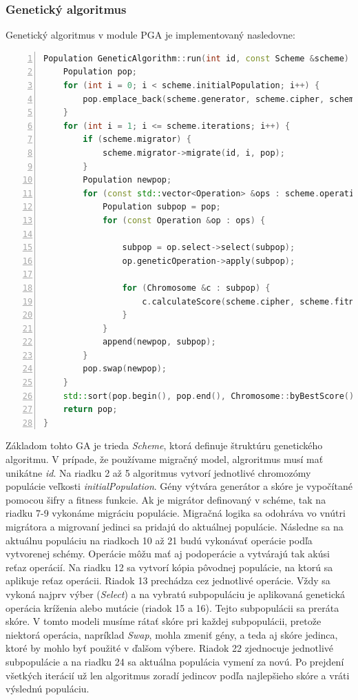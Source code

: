 \subsubsection{Genetický algoritmus}
Genetický algoritmus v module PGA je implementovaný nasledovne:
\begin{lstlisting}[language={c++}, caption={Genetický algoritmus}, numbers=left]
Population GeneticAlgorithm::run(int id, const Scheme &scheme) {
    Population pop;
    for (int i = 0; i < scheme.initialPopulation; i++) {
        pop.emplace_back(scheme.generator, scheme.cipher, scheme.fitness);
    }
    for (int i = 1; i <= scheme.iterations; i++) {
        if (scheme.migrator) {
            scheme.migrator->migrate(id, i, pop);
        }
        Population newpop;
        for (const std::vector<Operation> &ops : scheme.operations) {
            Population subpop = pop;
            for (const Operation &op : ops) {
          
                subpop = op.select->select(subpop);
                op.geneticOperation->apply(subpop);
          
                for (Chromosome &c : subpop) {
                    c.calculateScore(scheme.cipher, scheme.fitness, scheme.cache);
                }
            }
            append(newpop, subpop);
        }
        pop.swap(newpop);
    }
    std::sort(pop.begin(), pop.end(), Chromosome::byBestScore());
    return pop;
}
\end{lstlisting}
Základom tohto GA je trieda \textit{Scheme}, ktorá definuje štruktúru genetického algoritmu. V prípade, že používame migračný model, algroritmus musí mať unikátne \textit{id}.
Na riadku 2 až 5 algoritmus vytvorí jednotlivé chromozómy populácie veľkosti \textit{initialPopulation}. Gény výtvára generátor a skóre je vypočítané pomocou šifry a fitness funkcie.
Ak je migrátor definovaný v schéme, tak na riadku 7-9 vykonáme migráciu populácie. Migračná logika sa odohráva vo vnútri migrátora a migrovaní jedinci sa pridajú do aktuálnej populácie. Následne sa na aktuálnu populáciu na riadkoch 10 až 21 budú vykonávať operácie podľa vytvorenej schémy. Operácie môžu mať aj podoperácie a vytvárajú tak akúsi reťaz operácií. Na riadku 12 sa vytvorí kópia pôvodnej populácie, na ktorú sa aplikuje reťaz operácii. Riadok 13 prechádza cez jednotlivé operácie. Vždy sa vykoná najprv výber (\textit{Select}) a na vybratú subpopuláciu je aplikovaná genetická operácia kríženia alebo mutácie (riadok 15 a 16). Tejto subpopulácii sa preráta skóre. V tomto modeli musíme rátať skóre pri každej subpopulácii, pretože niektorá operácia, napríklad \textit{Swap}, mohla zmeniť gény, a teda aj skóre jedinca, ktoré by mohlo byť použité v ďalšom výbere. Riadok 22 zjednocuje jednotlivé subpopulácie a na riadku 24 sa aktuálna populácia vymení za novú. Po prejdení všetkých iterácií už len algoritmus zoradí jedincov podľa najlepšieho skóre a vráti výslednú populáciu.

